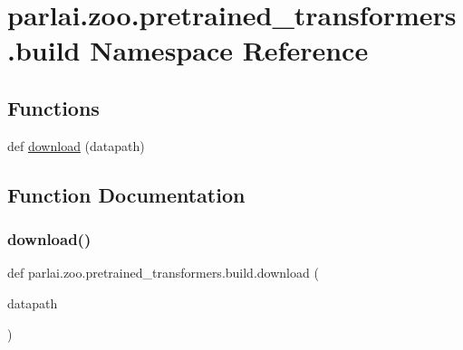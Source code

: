 \hypertarget{namespaceparlai_1_1zoo_1_1pretrained__transformers_1_1build}{}\section{parlai.\+zoo.\+pretrained\+\_\+transformers.\+build Namespace Reference}
\label{namespaceparlai_1_1zoo_1_1pretrained__transformers_1_1build}
\subsection*{Functions}
\begin{DoxyCompactItemize}
\item 
def \hyperlink{namespaceparlai_1_1zoo_1_1pretrained__transformers_1_1build_afaead0deab400e1c516706e85dd4ed9b}{download} (datapath)
\end{DoxyCompactItemize}


\subsection{Function Documentation}
\mbox{\label{namespaceparlai_1_1zoo_1_1pretrained__transformers_1_1build_afaead0deab400e1c516706e85dd4ed9b}} 
\subsubsection{\texorpdfstring{download()}{download()}}
{\footnotesize\ttfamily def parlai.\+zoo.\+pretrained\+\_\+transformers.\+build.\+download (\begin{DoxyParamCaption}\item[{}]{datapath }\end{DoxyParamCaption})}

